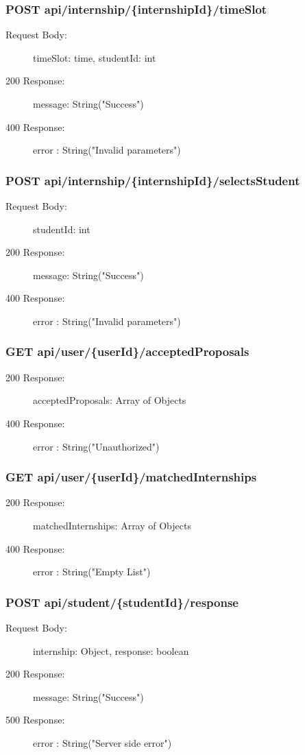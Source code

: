 \documentclass[a4paper,12pt]{article}
\begin{document}
\subsubsection*{POST api/internship/\{internshipId\}/timeSlot}
\begin{description}
    \item[Request Body:] timeSlot: time, studentId: int
    \item[200 Response:] message: String("Success") 
    \item[400 Response:] error : String("Invalid parameters")
\end{description}

\subsubsection*{POST api/internship/\{internshipId\}/selectsStudent}
\begin{description}
    \item[Request Body:] studentId: int
    \item[200 Response:] message: String("Success") 
    \item[400 Response:] error : String("Invalid parameters")
\end{description}

\subsubsection*{GET api/user/\{userId\}/acceptedProposals}
\begin{description}
    \item[200 Response:] acceptedProposals: Array of Objects 
    \item[400 Response:] error : String("Unauthorized")
\end{description}

\subsubsection*{GET api/user/\{userId\}/matchedInternships}
\begin{description}
    \item[200 Response:] matchedInternships: Array of Objects 
    \item[400 Response:] error : String("Empty List")
\end{description}

\subsubsection*{POST api/student/\{studentId\}/response}
\begin{description}
    \item[Request Body:] internship: Object, response: boolean
    \item[200 Response:] message: String("Success") 
    \item[500 Response:] error : String("Server side error")
\end{description}
\end{document}
